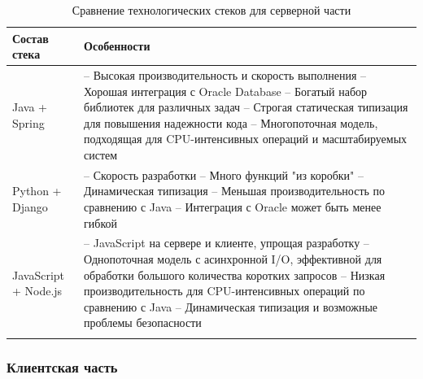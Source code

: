 \documentclass[a4paper,article]{article}
\begin{document}
    \begin{xltabular}{\textwidth} { |
        >{\hsize} X |
        >{\hsize} X | }

        \hline
        Состав стека
        & Особенности \\

        \hline
        Java + Spring
        & -- Высокая производительность и скорость выполнения \newline -- Хорошая интеграция с Oracle Database \newline -- Богатый набор библиотек для различных задач \newline -- Строгая статическая типизация для повышения надежности кода \newline -- Многопоточная модель, подходящая для CPU-интенсивных операций и масштабируемых систем \\

        \hline
        Python + Django
        & -- Скорость разработки \newline -- Много функций "из коробки" \newline -- Динамическая типизация \newline -- Меньшая производительность по сравнению с Java \newline -- Интеграция с Oracle может быть менее гибкой \\

        \hline
        JavaScript + Node.js
        & -- JavaScript на сервере и клиенте, упрощая разработку \newline -- Однопоточная модель с асинхронной I/O, эффективной для обработки большого количества коротких запросов \newline -- Низкая производительность для CPU-интенсивных операций по сравнению с Java \newline -- Динамическая типизация и возможные проблемы безопасности \\

        \hline

        \caption{\centering Сравнение технологических стеков для серверной части}

        \label{tab:Сравнение технологических стеков для серверной части}
    \end{xltabular}

    \subsubsection{Клиентская часть}\label{Реализация. Выбор. Клиентская часть}
\end{document}
